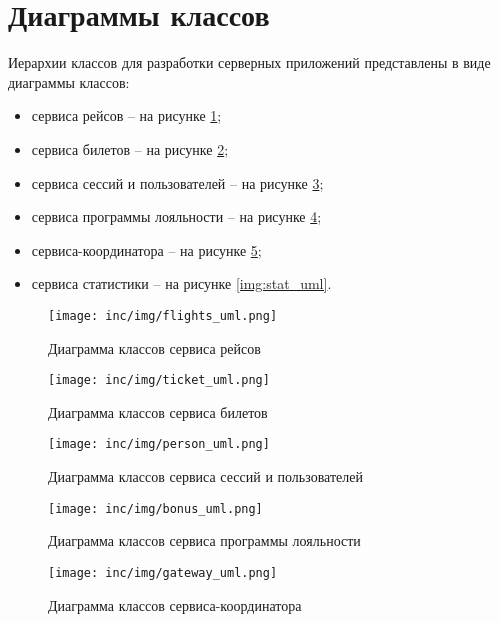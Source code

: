 \section{Диаграммы классов}


Иерархии классов для разработки серверных приложений представлены в виде диаграммы классов:
\begin{itemize}
    \item сервиса рейсов --  на рисунке \ref{img:flights_uml};
    \item сервиса билетов --  на рисунке \ref{img:ticket_uml};
    \item сервиса сессий и пользователей --  на рисунке \ref{img:person_uml};
    \item сервиса программы лояльности --  на рисунке \ref{img:bonus_uml};
    \item сервиса-координатора --  на рисунке \ref{img:gateway_uml};
    \item сервиса статистики --  на рисунке \ref{img:stat_uml}.
\end{itemize}



\begin{figure}[h!]
  \centering
  \texttt{[image: inc/img/flights\_uml.png]}
  \caption{Диаграмма классов сервиса рейсов}
  \label{img:flights_uml}
\end{figure}

\begin{figure}[h!]
  \centering
  \texttt{[image: inc/img/ticket\_uml.png]}
  \caption{Диаграмма классов сервиса билетов}
  \label{img:ticket_uml}
\end{figure}


\begin{figure}[h!]
  \centering
  \texttt{[image: inc/img/person\_uml.png]}
  \caption{Диаграмма классов сервиса сессий и пользователей}
  \label{img:person_uml}
\end{figure}

\begin{figure}[h!]
  \centering
  \texttt{[image: inc/img/bonus\_uml.png]}
  \caption{Диаграмма классов сервиса программы лояльности}
  \label{img:bonus_uml}
\end{figure}

\begin{figure}[h!]
  \centering
  \texttt{[image: inc/img/gateway\_uml.png]}
  \caption{Диаграмма классов сервиса-координатора}
  \label{img:gateway_uml}
\end{figure}

